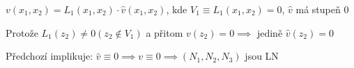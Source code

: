 \documentclass[../main.tex]{subfiles}
\begin{document}
\begin{lemma}
    $v(x_1, x_2) = L_1(x_1,x_2)\cdot\hat{v}(x_1,x_2)$, kde $V_1 \equiv L_1(x_1,x_2) = 0$, $\hat{v}$ má stupeň 0

    Protože $L_1(z_2)\neq0 (z_2 \notin V_1)$ a přitom $v(z_2) = 0 \implies$ jedině $\hat{v}(z_2) = 0$

    Předchozí implikuje: $\hat{v}\equiv0 \implies v\equiv0 \implies (N_1, N_2, N_3)$ jsou LN
\end{lemma}
\end{document}
